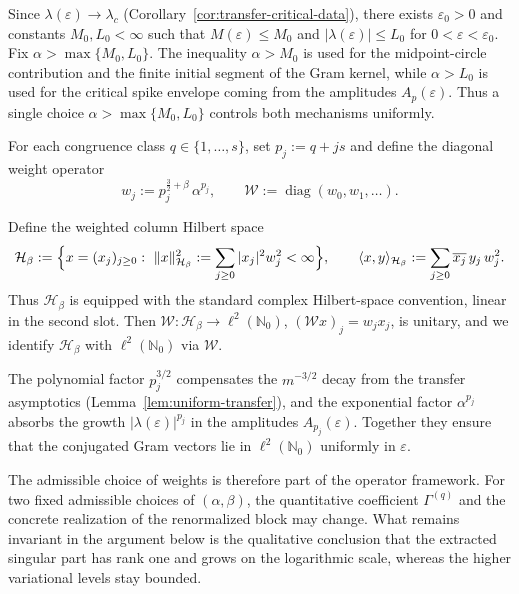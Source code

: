 \documentclass[11pt]{amsart}
\numberwithin{equation}{section}
\theoremstyle{plain}
\theoremstyle{definition}
\theoremstyle{remark}
\newcommand{\N}{\mathbb{N}}
\DeclareMathOperator{\diag}{diag}
\begin{document}
Since $\lambda(\varepsilon)\to\lambda_c$ (Corollary~\ref{cor:transfer-critical-data}), there exists
$\varepsilon_0>0$ and constants $M_0,L_0<\infty$ such that
$M(\varepsilon)\le M_0$ and $|\lambda(\varepsilon)|\le L_0$ for $0<\varepsilon<\varepsilon_0$.
Fix $\alpha>\max\{M_0,L_0\}$.
The inequality $\alpha>M_0$ is used for the midpoint-circle contribution and the
finite initial segment of the Gram kernel, while $\alpha>L_0$ is used for the
critical spike envelope coming from the amplitudes $A_p(\varepsilon)$. Thus a
single choice $\alpha>\max\{M_0,L_0\}$ controls both mechanisms uniformly.


For each congruence class $q\in\{1,\dots,s\}$, set $p_j:=q+js$ and
define the diagonal weight operator
\begin{equation}\label{eq:weights}
	w_j:=p_j^{\frac32+\beta}\,\alpha^{p_j},
	\qquad
	\mathcal W:=\diag(w_0,w_1,\dots).
\end{equation}

Define the weighted column Hilbert space
\begin{equation}\label{eq:weighted-Hilbert}
	\mathcal H_\beta
	:= \Bigl\{x=(x_j)_{j\ge0}:\
	\|x\|_{\mathcal H_\beta}^2
	:=\sum_{j\ge0}|x_j|^2 w_j^2<\infty\Bigr\},
	\qquad
	\langle x,y\rangle_{\mathcal H_\beta}
	:=\sum_{j\ge0}\overline{x_j}\,y_j\,w_j^2.
\end{equation}
Thus $\mathcal H_\beta$ is equipped with the standard complex Hilbert-space
convention, linear in the second slot. Then
$\mathcal W:\mathcal H_\beta\to\ell^2(\N_0)$, $(\mathcal W x)_j=w_jx_j$, is unitary, and we identify
$\mathcal H_\beta$ with $\ell^2(\N_0)$ via $\mathcal W$.

The polynomial factor $p_j^{3/2}$ compensates the $m^{-3/2}$ decay
from the transfer asymptotics (Lemma~\ref{lem:uniform-transfer}), and
the exponential factor $\alpha^{p_j}$ absorbs the growth
$|\lambda(\varepsilon)|^{p_j}$ in the amplitudes
$A_{p_j}(\varepsilon)$. Together they ensure that the conjugated Gram
vectors lie in $\ell^2(\N_0)$ uniformly in $\varepsilon$.

The admissible choice of weights is therefore part of the operator framework.  For two fixed admissible choices of \((\alpha,\beta)\), the quantitative coefficient \(\Gamma^{(q)}\) and the concrete realization of the renormalized block may change.  What remains invariant in the argument below is the qualitative conclusion that the extracted singular part has rank one and grows on the logarithmic scale, whereas the higher variational levels stay bounded.
\end{document}
